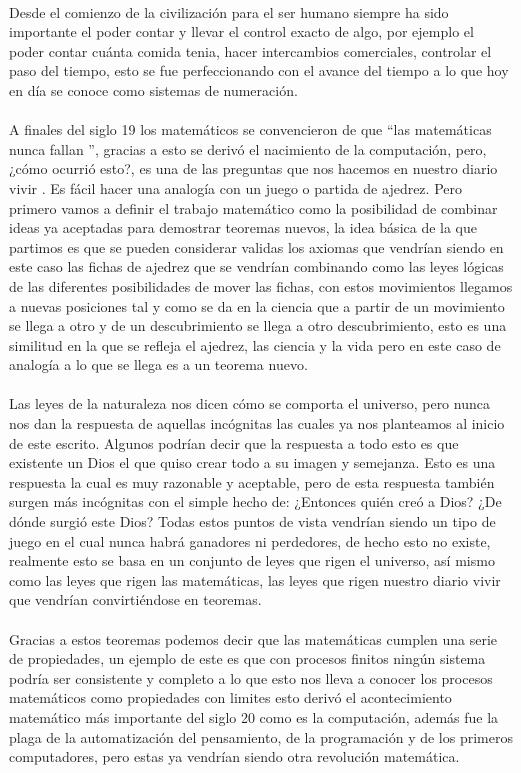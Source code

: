 \documentclass[12pt]{article}
\begin{document}
\noindent
\\ 
Desde el comienzo de la civilización para el ser humano siempre ha sido importante el poder contar y llevar el control exacto de algo,  por ejemplo el poder contar cuánta comida tenia, hacer intercambios comerciales, controlar el paso del tiempo, esto se fue perfeccionando con el avance del tiempo a lo que hoy en día se conoce como sistemas de numeración.\\
\noindent
\\
A finales del siglo 19 los matemáticos se convencieron de que “las matemáticas nunca fallan ”, gracias a esto se derivó el nacimiento de la computación, pero, ¿cómo ocurrió esto?, es una de las preguntas que nos hacemos en nuestro diario vivir .\cite{mlodinow2010} Es fácil hacer una analogía con un juego o partida de ajedrez. Pero primero vamos a definir el trabajo matemático como la posibilidad de combinar ideas ya aceptadas para demostrar teoremas nuevos, la idea básica de la que partimos es que se pueden considerar validas los axiomas que vendrían siendo en este caso las fichas de ajedrez que se vendrían combinando como las leyes lógicas de las diferentes posibilidades de mover las fichas, con estos movimientos llegamos a nuevas posiciones tal y como se da en la ciencia que a partir de un movimiento se llega a otro y de un descubrimiento se llega a otro descubrimiento, esto es una similitud en la que se refleja el ajedrez, las ciencia y la vida pero en este caso de analogía a lo que se llega es a un teorema nuevo.\\
\noindent
\\
Las leyes de la naturaleza nos dicen cómo se comporta el universo, pero nunca nos dan la respuesta de aquellas incógnitas las cuales ya nos planteamos al inicio de este escrito. Algunos podrían decir que la respuesta a todo esto es que existente un Dios el que quiso crear todo a su imagen y semejanza. Esto es una respuesta la cual es muy razonable y aceptable, pero de esta respuesta también surgen más incógnitas con el simple hecho de: ¿Entonces quién creó a Dios? ¿De dónde surgió este Dios? Todas estos puntos de vista vendrían siendo un tipo de juego en el cual nunca habrá ganadores ni perdedores, de hecho esto no existe, realmente esto se basa en un conjunto de leyes que rigen el universo, así mismo como las leyes que rigen las matemáticas, las leyes que rigen nuestro diario vivir que vendrían convirtiéndose en teoremas.\\
\noindent
\\
Gracias a estos teoremas podemos decir que las matemáticas cumplen una serie de propiedades, un ejemplo de este es que con procesos finitos ningún sistema podría ser consistente y completo a lo que esto nos lleva a conocer los procesos matemáticos como propiedades con limites esto derivó el acontecimiento matemático más importante del siglo 20 como es la computación, además fue la plaga de la automatización del pensamiento, de la programación y de los primeros computadores, pero estas ya vendrían siendo otra revolución matemática.

    

\end{document}

